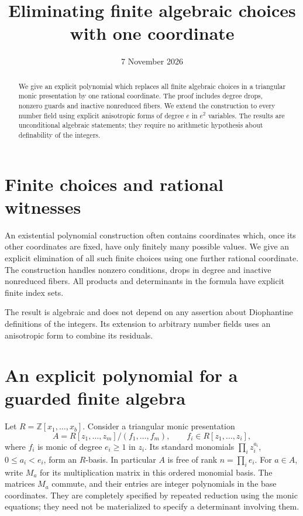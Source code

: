 \documentclass[11pt,a4paper]{article}
\title{Eliminating finite algebraic choices with one coordinate}
\author{}
\date{7 November 2026}
\theoremstyle{definition}
\theoremstyle{remark}
\begin{document}
\maketitle
\begin{abstract}
We give an explicit polynomial which replaces all finite
algebraic choices in a triangular monic presentation by one rational
coordinate. The proof includes degree drops, nonzero guards and
inactive nonreduced fibers. We extend the construction to every
number field using explicit anisotropic forms of degree $e$ in
$e^2$ variables. The results are unconditional algebraic statements;
they require no arithmetic hypothesis about definability of the integers.
\end{abstract}
\section{Finite choices and rational witnesses}
An existential polynomial construction often contains coordinates
which, once its other coordinates are fixed, have only finitely many
possible values. We give an explicit elimination of all such finite
choices using one further rational coordinate. The construction
handles nonzero conditions, drops in degree and inactive nonreduced
fibers. All products and determinants in the formula have explicit
finite index sets.

The result is algebraic and does not depend on any assertion about
Diophantine definitions of the integers. Its extension to arbitrary
number fields uses an anisotropic form to combine its residuals.
\section{An explicit polynomial for a guarded finite algebra}
\label{sec:explicit-finite-algebra}

Let $R=\mathbb Z[x_1,\ldots,x_b]$. Consider a triangular monic presentation
\[
 A=R[z_1,\ldots,z_m]/(f_1,\ldots,f_m),\qquad
 f_i\in R[z_1,\ldots,z_i],
\]
where $f_i$ is monic of degree $e_i\ge1$ in $z_i$. Its standard
monomials $\prod_i z_i^{a_i}$, $0\le a_i<e_i$, form an $R$-basis.
In particular $A$ is free of rank $n=\prod_i e_i$. For $a\in A$,
write $M_a$ for its multiplication matrix in this ordered monomial basis.
The matrices $M_a$ commute, and their entries are integer polynomials in
the base coordinates. They are completely specified by repeated reduction
using the monic equations; they need not be materialized to specify a
determinant involving them.
\end{document}
